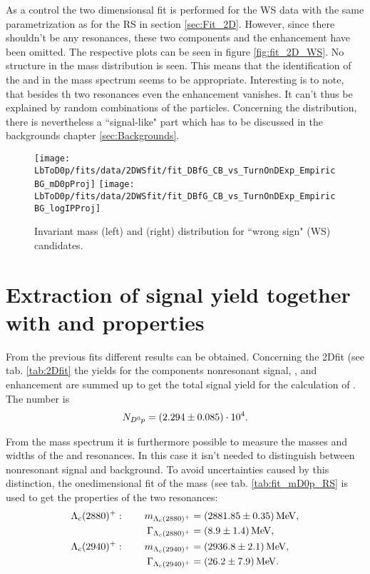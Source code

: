 As a control the two dimensionsal fit is performed for the WS data with the same parametrization as for the RS in section \ref{sec:Fit_2D}.
However, since there shouldn't be any resonances, these two components and the enhancement have been omitted.
The respective plots can be seen in figure \ref{fig:fit_2D_WS}. 
No structure in the mass distribution is seen. 
This means that the identification of the \LcResI and \LcResII in the \Dz\proton mass spectrum seems to be appropriate.
Interesting is to note, that besides th two resonances even the enhancement vanishes.
It can't thus be explained by random combinations of the particles.
Concerning the \logIP distribution, there is nevertheless a ``signal-like" part which has to be discussed in the backgrounds chapter \ref{sec:Backgrounds}.

\begin{figure}[hptb]
	\centering
	\texttt{[image: LbToD0p/fits/data/2DWSfit/fit\_DBfG\_CB\_vs\_TurnOnDExp\_EmpiricBG\_mD0pProj]}
	\texttt{[image: LbToD0p/fits/data/2DWSfit/fit\_DBfG\_CB\_vs\_TurnOnDExp\_EmpiricBG\_logIPProj]}
	\caption{Invariant mass (left) and \logIP (right) distribution for ``wrong sign" (WS) candidates.}
	\label{fig:fit_WS}
\end{figure}


\section{Extraction of \LbToDpmunuX signal yield together with \LcResI and \LcResII properties}

From the previous fits different results can be obtained. 
Concerning the 2Dfit (see tab. \ref{tab:2Dfit} the yields for the components nonresonant signal, \LcResI, \LcResII and enhancement are summed up to get the total \LbToDpmunuX signal yield \NDp for the calculation of \R. The number is
\begin{align*}
    N_{{{D}^0}{p}} = (2.294 \pm 0.085)\cdot 10^{4}. 
\end{align*}

From the \Dz\proton mass spectrum it is furthermore possible to measure the masses and widths of the \LcResI and \LcResII resonances. In this case it isn't needed to distinguish between nonresonant signal and background. 
To avoid uncertainties caused by this distinction, the onedimensional fit of the \Dz\proton mass (see tab. \ref{tab:fit_mD0p_RS} is used to get the properties of the two resonances:
\begin{align*}
    {\ensuremath{\Lambda}}_{c}(2880)^+: \qquad  m_{{\Lambda}_{c}(2880)^+}       &= (2881.85 \pm 0.35) \mathrm{\,Me\kern -0.1em V}, \\
                     \Gamma_{{\Lambda}_{c}(2880)^+}  &= (8.9 \pm 1.4) \mathrm{\,Me\kern -0.1em V}, \\
    {\Lambda}_{c}(2940)^+: \qquad m_{{\Lambda}_{c}(2940)^+}      &= (2936.8 \pm 2.1) \mathrm{\,Me\kern -0.1em V}, \\
                     \Gamma_{{\Lambda}_{c}(2940)^+} &= (26.2 \pm 7.9) \mathrm{\,Me\kern -0.1em V}. \\
\end{align*}
